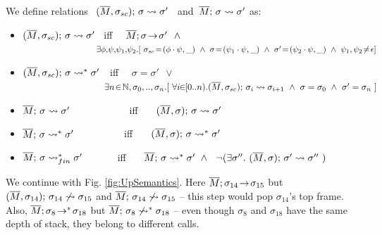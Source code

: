 
\begin{definition}
\label{def:shallow:term}
We define relations \    $(\overline{M}, \sigma_{sc});\, {\sigma} \rightsquigarrow \sigma'$ \ and\  $\overline{M};\, {\sigma} \rightsquigarrow \sigma'$ as:

\begin{itemize}
\item
 $(\overline{M}, \sigma_{sc});\, {\sigma} \rightsquigarrow \sigma'$ \    iff \ \   $\leadstoOrig {\Mtwo} {\sigma} {\sigma'} %
\ \  \wedge $\\
$\strut  \hspace{2.9cm}\ \      \exists \phi,\!\psi,\!\psi_1,\!\psi_2.[ \  \sigma\bd\! =\! (\phi\cdot\psi,\_) \ \wedge \ \sigma\! =\! (\psi_1\cdot \psi, \_)
\ \wedge\ \sigma'\! =\! (\psi_2\cdot \psi, \_)\ \wedge\ {\psi_1,\psi_2\!\neq\! \epsilon}] $ 
\item
 $(\overline{M}, \sigma_{sc});\, {\sigma} \rightsquigarrow^* \sigma'$\ \  iff \ \ $\sigma=\sigma'\ \ \vee$\\
$\strut  \hspace{3cm}\ \ \exists n\!\in\!\mathbb{N},\sigma_0,..,\sigma_n.[\ \forall i\!\! \in\!\! [0..n).\leadstoBoundedThree {\Mtwo}  {\sigma_i}  {\sigma\bd} {\sigma_{i+1}} \ \wedge\ \sigma=\sigma_0\ \wedge\ \sigma'=\sigma_n\ ]$
 \item
{  $\overline{M};\, {\sigma} \rightsquigarrow \sigma'$\ \  \ \ \ \ \ \   \ \ \ \ iff \ \ \ $(\overline{M}, \sigma);\, {\sigma} \rightsquigarrow \sigma'$}
  \item
{  $\overline{M};\, {\sigma} \rightsquigarrow^* \sigma'  $\ \ \ \ \ \ \ \ \   \ iff \ \ \ $(\overline{M}, \sigma);\, {\sigma} \rightsquigarrow^* \sigma'$}\ \  
\item
{  $\overline{M};\, {\sigma} \rightsquigarrow^*_{fin} \sigma'  $\ \ \ \ \ \   \ iff \ \ \ $\overline{M};\, {\sigma} \rightsquigarrow^* \sigma'  \ \wedge\ \ \neg(\exists 
\sigma''.\ (\overline{M}, \sigma);\, {\sigma'} \rightsquigarrow \sigma'' \ )$ }
 \end{itemize}
\end{definition}
 

We continue with  Fig. \ref{fig:UpSemantics}. Here $\overline{M};\sigma_{14}\! \rightarrow\! {\sigma_{15}}$ 
 but    $(\overline{M}, \sigma_{14});\, {\sigma_{14}} \not\rightsquigarrow \sigma_{15}$
and  $\overline{M};\, {\sigma_{14}} \not\rightsquigarrow \sigma_{15}$
--  this step would pop  $\sigma_{14}$'s
 top frame. 
 Also, $\overline{M};\sigma_8\! \rightarrow^*\! {\sigma_{18}}$ 
 but  $\overline{M};\, {\sigma_8} \not\rightsquigarrow^* \sigma_{18}$  -- even though $\sigma_8$ and $\sigma_{18}$ have the same depth of stack, they belong to different calls.

